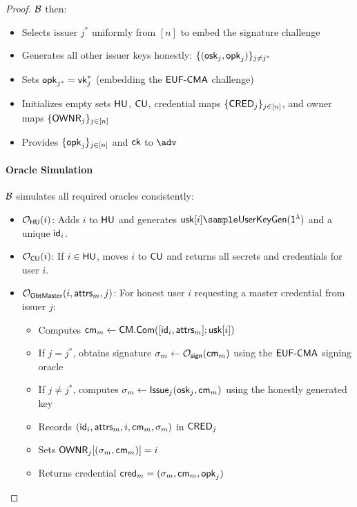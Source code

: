 \begin{proof}
$\mathcal{B}$ then:
\begin{itemize}
    \item Selects issuer $j^*$ uniformly from $[n]$ to embed the signature challenge
    \item Generates all other issuer keys honestly: $\{(\mathsf{osk}_j, \mathsf{opk}_j)\}_{j \neq j^*}$ 
    \item Sets $\mathsf{opk}_{j^*} = \mathsf{vk}_j^*$ (embedding the $\mathsf{EUF\text{-}CMA}$ challenge)
    \item Initializes empty sets $\mathsf{HU}$, $\mathsf{CU}$, credential maps $\{\mathsf{CRED}_j\}_{j \in [n]}$, and owner maps $\{\mathsf{OWNR}_j\}_{j \in [n]}$
    \item Provides $\{\mathsf{opk}_j\}_{j \in [n]}$ and $\mathsf{ck}$ to $\adv$
\end{itemize}

\paragraph{Oracle Simulation}
$\mathcal{B}$ simulates all required oracles consistently:

\begin{itemize}
    \item $\mathcal{O}_{\mathsf{HU}}(i)$: Adds $i$ to $\mathsf{HU}$ and generates $\usk[i] \sample \UserKeyGen(\secparam)$ and a unique $\mathsf{id}_i$.
    
    \item $\mathcal{O}_{\mathsf{CU}}(i)$: If $i \in \mathsf{HU}$, moves $i$ to $\mathsf{CU}$ and returns all secrets and credentials for user $i$.
    
    \item $\mathcal{O}_{\mathsf{ObtMaster}}(i, \mathsf{attrs}_m, j)$: For honest user $i$ requesting a master credential from issuer $j$:
    \begin{itemize}
        \item Computes $\mathsf{cm}_m \gets \mathsf{CM.Com}([\mathsf{id}_i, \mathsf{attrs}_m]; \mathsf{usk}[i])$
        \item If $j = j^*$, obtains signature $\sigma_m \gets \mathcal{O}_{\mathsf{sign}}(\mathsf{cm}_m)$ using the $\mathsf{EUF\text{-}CMA}$ signing oracle
        \item If $j \neq j^*$, computes $\sigma_m \gets \mathsf{Issue}_j(\mathsf{osk}_j, \mathsf{cm}_m)$ using the honestly generated key
        \item Records $(\mathsf{id}_i, \mathsf{attrs}_m, i, \mathsf{cm}_m, \sigma_m)$ in $\mathsf{CRED}_j$
        \item Sets $\mathsf{OWNR}_j[(\sigma_m, \mathsf{cm}_m)] = i$
        \item Returns credential $\mathsf{cred}_m = (\sigma_m, \mathsf{cm}_m, \mathsf{opk}_j)$
    \end{itemize}
    

\end{itemize}
\end{proof}
